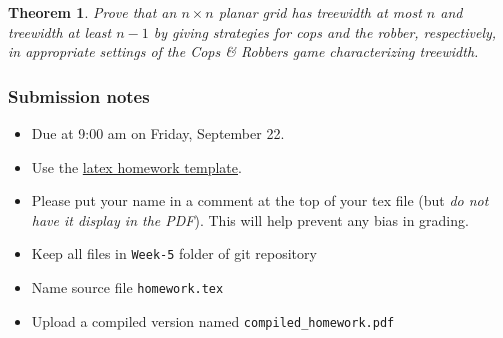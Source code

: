 \documentclass{article}
\newtheorem*{theorem}{Theorem}
\begin{document}
\begin{theorem} Prove that an $n \times n$ planar grid has treewidth at most $n$
  and treewidth at least $n-1$ by giving strategies for cops and the robber, respectively,
  in appropriate settings of the Cops \& Robbers game characterizing treewidth.
\end{theorem}

\vfill

\subsubsection*{Submission notes}
\begin{itemize}
\item Due at 9:00 am on Friday, September 22.
\item Use the \href{https://github.com/bdsullivan/ParameterizedAlgorithms-Fall2017/tree/master/templates/homework}{latex homework template}.
\item Please put your name in a comment at the top of your tex file (but {\it do not
have it display in the PDF}). This will help prevent any bias in grading.
\item Keep all files in \texttt{Week-5} folder of git repository
\item Name source file \texttt{homework.tex}
\item Upload a compiled version named \texttt{compiled\_homework.pdf}
\end{itemize}
\end{document}
